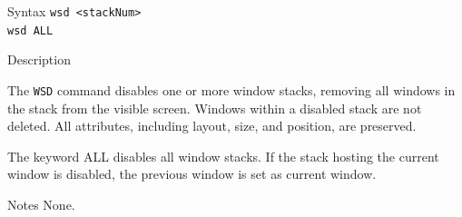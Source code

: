 %
%
\pagebreak
{}

\begin{iPageDescEntry}{Syntax}
\texttt{wsd <stackNum>} \\
\texttt{wsd ALL} \\
\end{iPageDescEntry}

\begin{iPageDescEntry}{Description}

The \texttt{WSD} command disables one or more window stacks, removing all
windows in the stack from the visible screen. Windows within a disabled stack are not deleted. All attributes, including layout, size, and position, are preserved.  

The keyword ALL disables all window stacks. If the stack hosting the current window is disabled, the previous window is set as current window.

\end{iPageDescEntry}

\begin{iPageDescEntry}{Notes}
None.
\end{iPageDescEntry}

